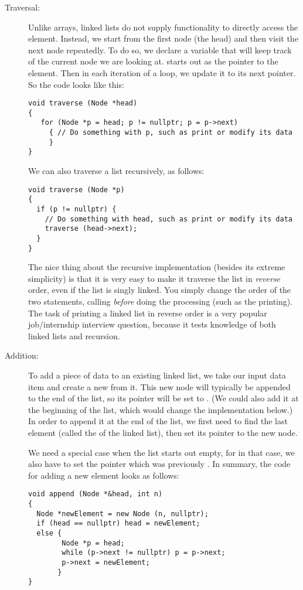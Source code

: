 \begin{description}
\item[Traversal:] Unlike arrays, linked lists do not supply
  functionality to directly access the  element.
  Instead, we start from the first node (the head) and then visit the
  next node repeatedly. 
  To do so, we declare a variable 
  that will keep track of the current node we are looking at.
   starts out as the pointer to the  element. 
  Then in each iteration of a  loop, we update it to its
  next pointer. So the code looks like this:
\begin{verbatim}
void traverse (Node *head)
{
   for (Node *p = head; p != nullptr; p = p->next)
     { // Do something with p, such as print or modify its data
     }
}
\end{verbatim}

  We can also traverse a list recursively, as follows:
\begin{verbatim}
void traverse (Node *p)
{
  if (p != nullptr) {
    // Do something with head, such as print or modify its data
    traverse (head->next);
  }
}
\end{verbatim}

The nice thing about the recursive implementation (besides its extreme
simplicity) is that it is very easy to make it traverse the list in
\emph{reverse} order, even if the list is singly linked.
You simply change the order of the two statements, calling
 \emph{before} doing the processing
(such as the printing).
The task of printing a linked list in reverse order is a
very popular job/internship interview question,
because it tests knowledge of both linked lists and recursion.

\item[Addition:]
  To add a piece of data to an existing linked list,
  we take our input data item and create a new  from it.
  This new node will typically be appended to the end of the list,
  so its  pointer will be set to . 
  (We could also add it at the beginning of the list, which would change
  the implementation below.)
  In order to append it at the end of the list, we first need to find
  the last element (called the  of the linked list),
  then set its  pointer to the new node. 

  We need a special case when the list starts out empty,
  for in that case, we also have to set the  pointer which
  was previously .
In summary, the code for adding a new element looks as follows:
\begin{verbatim}
void append (Node *&head, int n)
{
  Node *newElement = new Node (n, nullptr);
  if (head == nullptr) head = newElement;
  else { 
        Node *p = head;
        while (p->next != nullptr) p = p->next;
        p->next = newElement;
       }
}
\end{verbatim}


\end{description}

